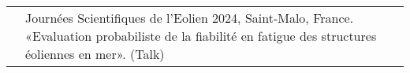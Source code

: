 \begin{center}
\begin{tabularx}{\textwidth}{c X}
                    & Journ\'{e}es Scientifiques de l’Eolien 2024, Saint-Malo, France. «Evaluation probabiliste de la fiabilit\'{e} en fatigue des structures \'{e}oliennes en mer». (Talk)
                    
        \end{tabularx}    
\end{center}